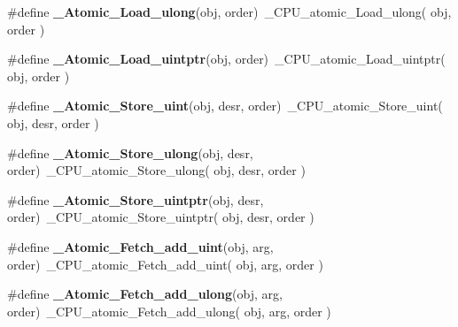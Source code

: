 \begin{DoxyCompactItemize}
\item 
\mbox{\label{group__RTEMSScoreAtomic_ga6653a2e0e0420532746c13133fc68108}} 
\#define {\bfseries \+\_\+\+Atomic\+\_\+\+Load\+\_\+ulong}(obj,  order)~\+\_\+\+C\+P\+U\+\_\+atomic\+\_\+\+Load\+\_\+ulong( obj, order )
\item 
\mbox{\label{group__RTEMSScoreAtomic_ga9ecc69986d092a2bac8b1203e7f20fbd}} 
\#define {\bfseries \+\_\+\+Atomic\+\_\+\+Load\+\_\+uintptr}(obj,  order)~\+\_\+\+C\+P\+U\+\_\+atomic\+\_\+\+Load\+\_\+uintptr( obj, order )
\item 
\mbox{\label{group__RTEMSScoreAtomic_ga853b36abeef711faad74befa793f869b}} 
\#define {\bfseries \+\_\+\+Atomic\+\_\+\+Store\+\_\+uint}(obj,  desr,  order)~\+\_\+\+C\+P\+U\+\_\+atomic\+\_\+\+Store\+\_\+uint( obj, desr, order )
\item 
\mbox{\label{group__RTEMSScoreAtomic_gafe61fca64f7b56a78037a26684e363fb}} 
\#define {\bfseries \+\_\+\+Atomic\+\_\+\+Store\+\_\+ulong}(obj,  desr,  order)~\+\_\+\+C\+P\+U\+\_\+atomic\+\_\+\+Store\+\_\+ulong( obj, desr, order )
\item 
\mbox{\label{group__RTEMSScoreAtomic_gad348581dd19ada07db3142741db8f3c6}} 
\#define {\bfseries \+\_\+\+Atomic\+\_\+\+Store\+\_\+uintptr}(obj,  desr,  order)~\+\_\+\+C\+P\+U\+\_\+atomic\+\_\+\+Store\+\_\+uintptr( obj, desr, order )
\item 
\mbox{\label{group__RTEMSScoreAtomic_gab8d0ff41bf73b9be5bb0cd7ee7c2bb13}} 
\#define {\bfseries \+\_\+\+Atomic\+\_\+\+Fetch\+\_\+add\+\_\+uint}(obj,  arg,  order)~\+\_\+\+C\+P\+U\+\_\+atomic\+\_\+\+Fetch\+\_\+add\+\_\+uint( obj, arg, order )
\item 
\mbox{\label{group__RTEMSScoreAtomic_gad7625024087f7fd282569554d0ce8af4}} 
\#define {\bfseries \+\_\+\+Atomic\+\_\+\+Fetch\+\_\+add\+\_\+ulong}(obj,  arg,  order)~\+\_\+\+C\+P\+U\+\_\+atomic\+\_\+\+Fetch\+\_\+add\+\_\+ulong( obj, arg, order )
\item 
\mbox{\label{group__RTEMSScoreAtomic_gaf853360444236b72e31d8b280494fb19}} 

\end{DoxyCompactItemize}
